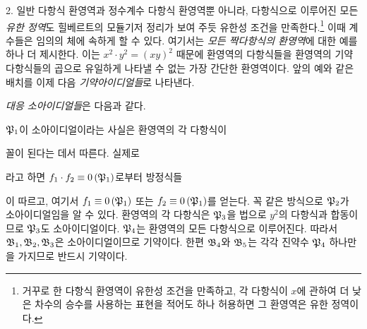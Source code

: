 2. 일반 다항식 환영역과 정수계수 다항식 환영역뿐 아니라, 다항식으로 이루어진 모든 \emph{유한 정역}도 힐베르트의 모듈기저 정리가 보여 주듯 유한성 조건을 만족한다.\footnote{거꾸로 한 다항식 환영역이 유한성 조건을 만족하고, 각 다항식이 $x$에 관하여 더 낮은 차수의 승수를 사용하는 표현을 적어도 하나 허용하면 그 환영역은 유한 정역이다.} 이때 계수들은 임의의 체에 속하게 할 수 있다. 여기서는 \emph{모든 짝다항식의 환영역}에 대한 예를 하나 더 제시한다. 이는 $x^2\cdot y^2=(xy)^2$ 때문에 환영역의 다항식들을 환영역의 기약다항식들의 곱으로 유일하게 나타낼 수 없는 가장 간단한 환영역이다. 앞의 예와 같은 배치를 이제 다음 \emph{기약아이디얼들}로 나타낸다.
\par\medskip
\noindent{}\par
\noindent{}\par
\noindent{}\par\medskip
\emph{대응 소아이디얼들}은 다음과 같다.
\par\smallskip
\noindent{}\par\medskip
$\mathfrak{P}_1$이 소아이디얼이라는 사실은 환영역의 각 다항식이
\par\smallskip
\noindent{}\par\smallskip
꼴이 된다는 데서 따른다. 실제로
\par\smallskip
\noindent{}\par\smallskip
라고 하면 $f_1\cdot f_2\equiv 0\,(\mathfrak{P}_1)$로부터 방정식들
\par\smallskip
\noindent{}\par
이 따르고, 여기서 $f_1\equiv 0\,(\mathfrak{P}_1)$ 또는 $f_2\equiv 0\,(\mathfrak{P}_1)$를 얻는다. 꼭 같은 방식으로 $\mathfrak{P}_2$가 소아이디얼임을 알 수 있다. 환영역의 각 다항식은 $\mathfrak{P}_3$을 법으로 $y^2$의 다항식과 합동이므로 $\mathfrak{P}_3$도 소아이디얼이다. $\mathfrak{P}_4$는 환영역의 모든 다항식으로 이루어진다. 따라서 $\mathfrak{B}_1,\mathfrak{B}_2,\mathfrak{B}_3$은 소아이디얼이므로 기약이다. 한편 $\mathfrak{B}_4$와 $\mathfrak{B}_5$는 각각 진약수 $\mathfrak{P}_4$ 하나만을 가지므로 반드시 기약이다.

